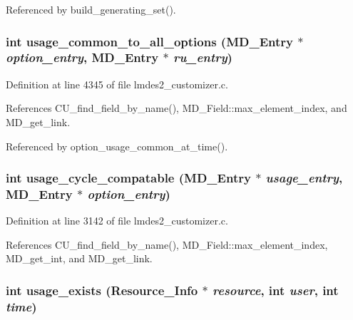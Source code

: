 Referenced by build\_\-generating\_\-set().
\subsubsection{\setlength{\rightskip}{0pt plus 5cm}int usage\_\-common\_\-to\_\-all\_\-options (\bf{MD\_\-Entry} $\ast$ {\em option\_\-entry}, \bf{MD\_\-Entry} $\ast$ {\em ru\_\-entry})}\label{lmdes2__customizer_8c_9676b54b21aedb75cd1024a8d8192b82}




Definition at line 4345 of file lmdes2\_\-customizer.c.

References CU\_\-find\_\-field\_\-by\_\-name(), MD\_\-Field::max\_\-element\_\-index, and MD\_\-get\_\-link.

Referenced by option\_\-usage\_\-common\_\-at\_\-time().
\subsubsection{\setlength{\rightskip}{0pt plus 5cm}int usage\_\-cycle\_\-compatable (\bf{MD\_\-Entry} $\ast$ {\em usage\_\-entry}, \bf{MD\_\-Entry} $\ast$ {\em option\_\-entry})}\label{lmdes2__customizer_8c_aa03acc0339bfa5eb1dfac59e896fe1a}




Definition at line 3142 of file lmdes2\_\-customizer.c.

References CU\_\-find\_\-field\_\-by\_\-name(), MD\_\-Field::max\_\-element\_\-index, MD\_\-get\_\-int, and MD\_\-get\_\-link.
\subsubsection{\setlength{\rightskip}{0pt plus 5cm}int usage\_\-exists (\bf{Resource\_\-Info} $\ast$ {\em resource}, int {\em user}, int {\em time})}\label{lmdes2__customizer_8c_50502d936ec33def8a9137058724306b}




